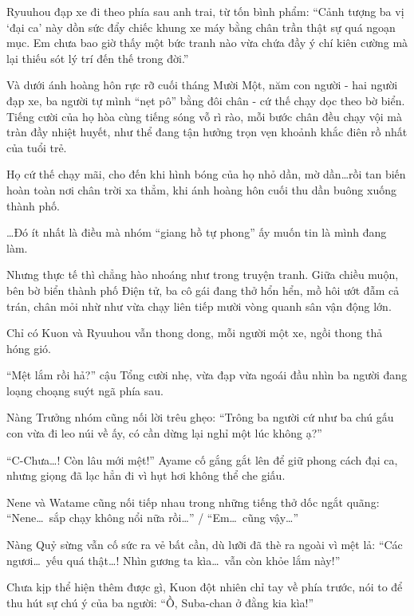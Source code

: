 \documentclass[../main.tex]{subfiles}
\begin{document}
Ryuuhou đạp xe đi theo phía sau anh trai, từ tốn bình phẩm: ``Cảnh tượng ba vị `đại ca' này dồn sức đẩy chiếc khung xe máy bằng chân trần thật sự quá ngoạn mục. Em chưa bao giờ thấy một bức tranh nào vừa chứa đầy ý chí kiên cường mà lại thiếu sót lý trí đến thế trong đời.''

Và dưới ánh hoàng hôn rực rỡ cuối tháng Mười Một, năm con người - hai người đạp xe, ba người tự mình ``nẹt pô'' bằng đôi chân - cứ thế chạy dọc theo bờ biển. Tiếng cười của họ hòa cùng tiếng sóng vỗ rì rào, mỗi bước chân đều chạy vội mà tràn đầy nhiệt huyết, như thể đang tận hưởng trọn vẹn khoảnh khắc điên rồ nhất của tuổi trẻ.

Họ cứ thế chạy mãi, cho đến khi hình bóng của họ nhỏ dần, mờ dần\dots rồi tan biến hoàn toàn nơi chân trời xa thẳm, khi ánh hoàng hôn cuối thu dần buông xuống thành phố.


\omk

\dots Đó ít nhất là điều mà nhóm ``giang hồ tự phong'' ấy muốn tin là mình đang làm.

Nhưng thực tế thì chẳng hào nhoáng như trong truyện tranh. Giữa chiều muộn, bên bờ biển thành phố Điện tử, ba cô gái đang thở hổn hển, mồ hôi ướt đẫm cả trán, chân mỏi nhừ như vừa chạy liên tiếp mười vòng quanh sân vận động lớn.

Chỉ có Kuon và Ryuuhou vẫn thong dong, mỗi người một xe, ngồi thong thả hóng gió.

``Mệt lắm rồi hả?'' cậu Tổng cười nhẹ, vừa đạp vừa ngoái đầu nhìn ba người đang loạng choạng suýt ngã phía sau.

Nàng Trưởng nhóm cũng nối lời trêu ghẹo: ``Trông ba người cứ như ba chú gấu con vừa đi leo núi về ấy, có cần dừng lại nghỉ một lúc không ạ?''

``C-Chưa\dots! Còn lâu mới mệt!'' Ayame cố gắng gắt lên để giữ phong cách đại ca, nhưng giọng đã lạc hẳn đi vì hụt hơi không thể che giấu.

Nene và Watame cũng nối tiếp nhau trong những tiếng thở dốc ngắt quãng: ``Nene\dots\ sắp chạy không nổi nữa rồi\dots'' / ``Em\dots\ cũng vậy\dots''

Nàng Quỷ sừng vẫn cố sức ra vẻ bất cần, dù lưỡi đã thè ra ngoài vì mệt lả: ``Các ngươi\dots\ yếu quá thật\dots! Nhìn gương ta kìa\dots\ vẫn còn khỏe lắm này!''

Chưa kịp thể hiện thêm được gì, Kuon đột nhiên chỉ tay về phía trước, nói to để thu hút sự chú ý của ba người: ``Ồ, Suba-chan ở đằng kia kìa!''
\end{document}
